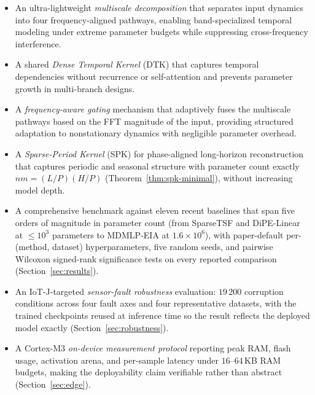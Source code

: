 \documentclass[journal]{IEEEtran}
\theoremstyle{remark}
\begin{document}
\begin{itemize}
\item[\textbf{(C1)}] An ultra-lightweight \emph{multiscale
  decomposition} that separates input dynamics into four
  frequency-aligned pathways, enabling band-specialized temporal
  modeling under extreme parameter budgets while suppressing
  cross-frequency interference.

\item[\textbf{(C2)}] A shared \emph{Dense Temporal Kernel} (DTK) that
  captures temporal dependencies without recurrence or self-attention
  and prevents parameter growth in multi-branch designs.

\item[\textbf{(C3)}] A \emph{frequency-aware gating} mechanism that
  adaptively fuses the multiscale pathways based on the FFT magnitude
  of the input, providing structured adaptation to nonstationary
  dynamics with negligible parameter overhead.

\item[\textbf{(C4)}] A \emph{Sparse-Period Kernel} (SPK) for
  phase-aligned long-horizon reconstruction that captures periodic
  and seasonal structure with parameter count exactly
  $nm = (L/P)(H/P)$ (Theorem~\ref{thm:spk-minimal}), without
  increasing model depth.

\item[\textbf{(C5)}] A comprehensive benchmark against eleven recent
  baselines that span five orders of magnitude in parameter count
  (from SparseTSF and DiPE-Linear at $\le\!10^{3}$ parameters to
  MDMLP-EIA at $1.6\!\times\!10^{6}$), with paper-default
  per-(method, dataset) hyperparameters, five random seeds, and
  pairwise Wilcoxon signed-rank significance tests on every
  reported comparison (Section~\ref{sec:results}).

\item[\textbf{(C6)}] An IoT-J-targeted \emph{sensor-fault robustness}
  evaluation: $19\,200$ corruption conditions across four fault axes
  and four representative datasets, with the trained checkpoints
  reused at inference time so the result reflects the deployed model
  exactly (Section~\ref{sec:robustness}).

\item[\textbf{(C7)}] A Cortex-M3 \emph{on-device measurement
  protocol} reporting peak RAM, flash usage, activation arena, and
  per-sample latency under $16$--$64$\,KB RAM budgets, making the
  deployability claim verifiable rather than abstract
  (Section~\ref{sec:edge}).
\end{itemize}
\end{document}
